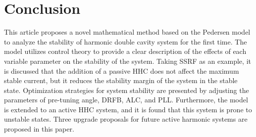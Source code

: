 \documentclass[letterpaper,
               nospread,     %
               ]{jacow}
\begin{document}
\section{Conclusion}
This article proposes a novel mathematical method based on the Pedersen model
to analyze the stability of harmonic double cavity system for the first time.
The model utilizes control theory to provide a clear description of the effects
of each variable parameter on the stability of the system. Taking SSRF as an
example, it is discussed that the addition of a passive HHC does not affect
the maximum stable current, but it reduces the stability margin of the system
in the stable state. Optimization strategies for system stability are
presented by adjusting the parameters of pre-tuning angle, DRFB, ALC, and PLL.
Furthermore, the model is extended to an active HHC system, and it is found
that this system is prone to unstable states. Three upgrade proposals for
future active harmonic systems are proposed in this paper.
\end{document}
